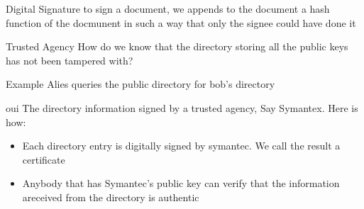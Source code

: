 \begin{parag}{Digital Signature}
    to sign a document, we appends to the document a hash function of the docmunent in such  a way that only the signee could have done it 
    
\end{parag}


\begin{parag}{Trusted Agency}
    How do we know that the directory storing all the public keys has not been tampered with?
    \begin{subparag}{Example}
        Alies queries the public directory for bob's directory
        
    \end{subparag}
    \begin{subparag}{oui} 
        The directory information signed by a trusted agency, Say Symantex. Here is how:
       \begin{itemize}
           Symantec's public key is distributed one and for all via a channel that cannot be tapered with (e.g., hard coded into the crypto hardware)
           \item Each directory entry is digitally signed by symantec. We call the result a certificate
           \item Anybody that has Symantec's public key can verify that the information areceived from the directory is authentic
           
       \end{itemize}
       
       
   \end{subparag} 
\end{parag}
